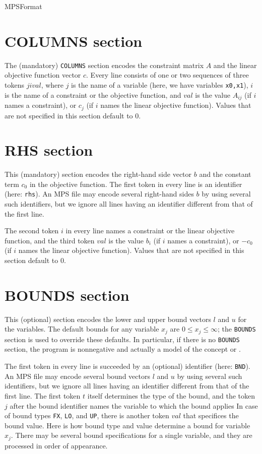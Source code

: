 \begin{ccRefConcept}{MPSFormat}
\section*{COLUMNS section}
The (mandatory) \texttt{COLUMNS} section encodes the constraint matrix
$A$ and the linear objective function vector $c$. Every line consists
of one or two sequences of three tokens $j i val$, where $j$ is the
name of a variable (here, we have variables \texttt{x0,x1}), $i$ is
the name of a constraint or the objective function, and $val$ is the
value $A_{ij}$ (if $i$ names a constraint), or $c_j$ (if $i$ names the
linear objective function). Values that are not specified in this
section default to $0$.

\section*{RHS section}
This (mandatory) section encodes the right-hand side vector $b$ and
the constant term $c_0$ in the objective function. The first token in
every line is an identifier (here: \texttt{rhs}). An MPS file may
encode several right-hand sides $b$ by using several such identifiers,
but we ignore all lines having an identifier different from that of
the first line.

The second token $i$ in every line names a constraint or the linear 
objective function, and the third token $val$ is the value $b_i$ (if
$i$ names a constraint), or $-c_0$ (if $i$ names the linear objective
function). Values that are not specified in this section default to $0$.

\section*{BOUNDS section}
This (optional) section encodes the lower and upper bound vectors $l$ 
and $u$ for the variables. The default bounds for any variable $x_j$ are
$0\leq x_j\leq \infty$; the
\texttt{BOUNDS} section is used to override these defaults. In particular,
if there is no \texttt{BOUNDS} section, the program is nonnegative and
actually a model of the concept  
or .

The first token in every line is succeeded by an (optional) identifier
(here: \texttt{BND}). An MPS file may encode several bound vectors $l$
and $u$ by using several such identifiers, but we ignore all lines
having an identifier different from that of the first line. The first
token $t$ itself determines the type of the bound, and the token $j$
after the bound identifier names the variable to which the bound applies
In case of bound types \texttt{FX}, \texttt{LO}, and
\texttt{UP}, there is another token $val$ that specifices the bound
value. Here is how bound type and value determine a bound for variable
$x_j$. There may be several bound specifications for a single variable, and
they are processed in order of appearance.


\end{ccRefConcept}
